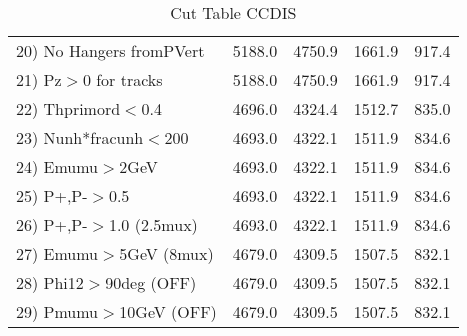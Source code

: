 \begin{table}[h!]
\begin{tabular}{||l||r|r|r|r||}
 20) No Hangers fromPVert &      5188.0 &      4750.9 &      1661.9 &       917.4 \\
 21) Pz$>$0 for tracks    &      5188.0 &      4750.9 &      1661.9 &       917.4 \\
 22) Thprimord$<$0.4      &      4696.0 &      4324.4 &      1512.7 &       835.0 \\
 23) Nunh*fracunh$<$200   &      4693.0 &      4322.1 &      1511.9 &       834.6 \\
 24) Emumu$>$2GeV         &      4693.0 &      4322.1 &      1511.9 &       834.6 \\
 25) P+,P-$>$0.5          &      4693.0 &      4322.1 &      1511.9 &       834.6 \\
 26) P+,P-$>$1.0 (2.5mux) &      4693.0 &      4322.1 &      1511.9 &       834.6 \\
 27) Emumu$>$5GeV  (8mux) &      4679.0 &      4309.5 &      1507.5 &       832.1 \\
 28) Phi12$>$90deg  (OFF) &      4679.0 &      4309.5 &      1507.5 &       832.1 \\
 29) Pmumu$>$10GeV  (OFF) &      4679.0 &      4309.5 &      1507.5 &       832.1 \\
 \hline
 \hline
 \end{tabular}
 \caption{Cut Table  CCDIS  }
 \label{tab-cut_ccdis}
 \end{table}
